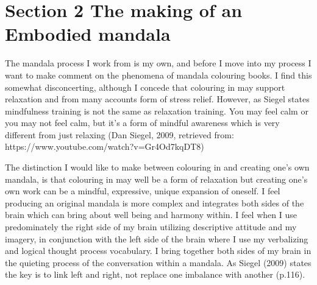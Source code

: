 \chapter{Section 2
The making of an Embodied mandala}








The mandala process I work from is my own, and before I move into my process I want to make comment on the phenomena of mandala colouring books. I find this somewhat disconcerting, although I concede that colouring in may support relaxation and from many accounts form of stress relief. 
However, as Siegel states mindfulness training is not the same as relaxation training. You may feel calm or you may not feel calm, but it's a form of mindful awareness which is very different from just relaxing (Dan Siegel, 2009, retrieved from: https://www.youtube.com/watch?v=Gr4Od7kqDT8)

The distinction I would like to make between colouring in and creating one's own mandala, is that colouring in may well be a form of relaxation but creating one's own work can be a mindful, expressive, unique expansion of oneself. I feel producing an original mandala is more complex and integrates both sides of the brain which can bring about well being and harmony within. I feel when I use predominately the right side of my brain utilizing descriptive attitude and my imagery, in conjunction with the left side of the brain where I use my verbalizing and logical thought process vocabulary. I bring together both sides of my brain in the quieting process of the conversation within a mandala. As Siegel (2009) states the key is to link left and right, not replace one imbalance with another (p.116). 

